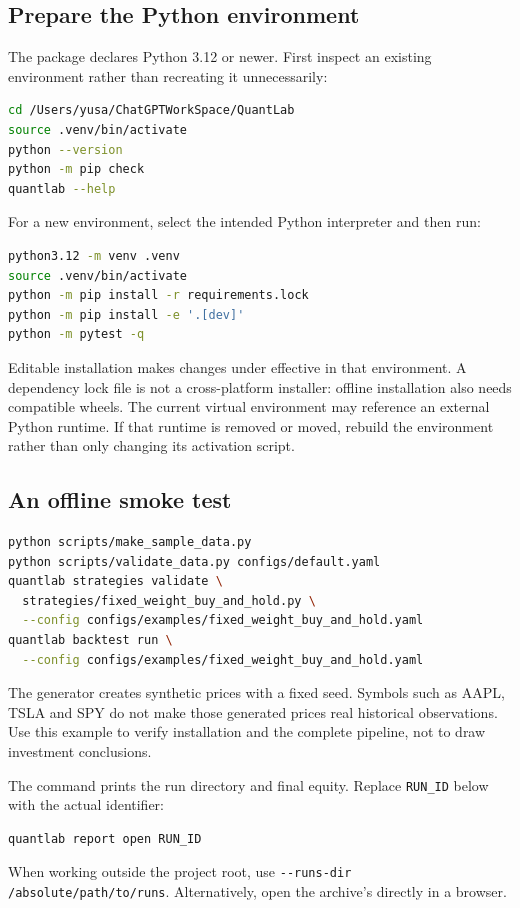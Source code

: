 \documentclass[11pt]{article}
\newcommand{\code}[1]{\nolinkurl{#1}}
\let\originalsubsection\subsection
\renewcommand{\subsection}{\Needspace{8\baselineskip}\originalsubsection}
\begin{document}
\subsection{Prepare the Python environment}
The package declares Python 3.12 or newer. First inspect an existing environment rather than recreating it unnecessarily:
\begin{lstlisting}[language=bash]
cd /Users/yusa/ChatGPTWorkSpace/QuantLab
source .venv/bin/activate
python --version
python -m pip check
quantlab --help
\end{lstlisting}
For a new environment, select the intended Python interpreter and then run:
\begin{lstlisting}[language=bash]
python3.12 -m venv .venv
source .venv/bin/activate
python -m pip install -r requirements.lock
python -m pip install -e '.[dev]'
python -m pytest -q
\end{lstlisting}
Editable installation makes changes under  effective in that environment. A dependency lock file is not a cross-platform installer: offline installation also needs compatible wheels. The current virtual environment may reference an external Python runtime. If that runtime is removed or moved, rebuild the environment rather than only changing its activation script.

\subsection{An offline smoke test}
\begin{lstlisting}[language=bash]
python scripts/make_sample_data.py
python scripts/validate_data.py configs/default.yaml
quantlab strategies validate \
  strategies/fixed_weight_buy_and_hold.py \
  --config configs/examples/fixed_weight_buy_and_hold.yaml
quantlab backtest run \
  --config configs/examples/fixed_weight_buy_and_hold.yaml
\end{lstlisting}
The generator creates synthetic prices with a fixed seed. Symbols such as AAPL, TSLA and SPY do not make those generated prices real historical observations. Use this example to verify installation and the complete pipeline, not to draw investment conclusions.

The command prints the run directory and final equity. Replace \code{RUN_ID} below with the actual identifier:
\begin{lstlisting}[language=bash]
quantlab report open RUN_ID
\end{lstlisting}
When working outside the project root, use \code{--runs-dir /absolute/path/to/runs}. Alternatively, open the archive's  directly in a browser.
\end{document}
